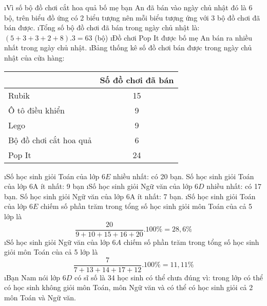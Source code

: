 \begin{Answer}{8}
		\begin{enumerate}[a),leftmargin=*]
			\i Vì số bộ đồ chơi cắt hoa quả bố mẹ bạn An đã bán vào ngày chủ nhật đó là 6 bộ, trên biểu đồ ứng có 2 biểu tượng nên mỗi biểu tượng  ứng với 3 bộ đồ chơi đã bán được.
			\i Tổng số bộ đồ chơi đã bán trong ngày chủ nhật là: $\left( {5 + 3 + 3 + 2 + 8} \right).3 = 63$  (bộ)
			\i Đồ chơi Pop It được bố mẹ An bán ra nhiều nhất trong ngày chủ nhật.
			\i Bảng thống kê số đồ chơi bán được trong ngày chủ nhật của cửa hàng:
			\begin{center}
				\begin{tabular}{|l|c|}
					\hline
					&Số đồ chơi đã bán\\
					\hline
					Rubik&	15\\
					\hline
					Ô tô điều khiển&	9\\
					\hline
					Lego&	9\\
					\hline
					Bộ đồ chơi cắt hoa quả&	6\\
					\hline
					Pop It&	24\\
					\hline
				\end{tabular}
			\end{center}
		\end{enumerate}
	
\end{Answer}
\begin{Answer}{9}
		\begin{enumerate}[a),leftmargin=*]
			\i Số học sinh giỏi Toán của lớp $6E$ nhiều nhất: có 20 bạn. Số học sinh giỏi Toán của lớp 6A ít nhất: 9 bạn
			\i Số học sinh giỏi Ngữ văn của lớp $6D$ nhiều nhất: có 17 bạn. Số học sinh giỏi Ngữ văn của lớp 6A ít nhất: 7 bạn.
			\i Số học sinh giỏi Toán của lớp $6E$ chiếm số phần trăm trong tổng số học sinh giỏi môn Toán của cả 5 lớp là
			\[\frac{{20}}{{9 + 10 + 15 + 16 + 20}}.100\%  = 28,6\%\]
			\i Số học sinh giỏi Ngữ văn của lớp $6A$ chiếm số phần trăm trong tổng số học sinh giỏi môn Toán của cả 5 lớp là
			\[\frac{7}{{7 + 13 + 14 + 17 + 12}}.100\%  = 11,11\%\]
			\i Bạn Nam nói lớp $6D$ có sĩ số là 34 học sinh có thể chưa đúng vì: trong lớp có thể có học sinh không giỏi môn Toán, môn Ngữ văn và có thể có học sinh giỏi cả 2 môn Toán và Ngữ văn.
		\end{enumerate}
	
\end{Answer}
